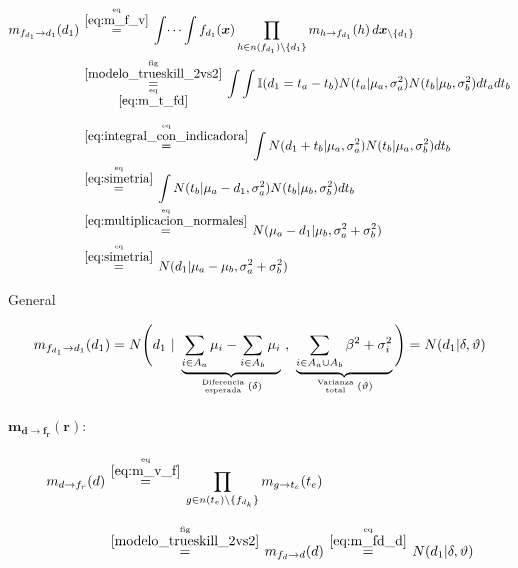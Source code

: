 \documentclass[article]{jss}
\newcommand\hfrac[2]{\genfrac{}{}{0pt}{}{#1}{#2}} %
\begin{document}
\begin{appendix}
\begin{equation}
 \begin{split}
  m_{f_{d_1} \rightarrow d_1}(d_1) & \overset{\hfrac{\text{eq}}{\ref{eq:m_f_v}}}{=} \int \dots \int f_{d_1}(\bm{x}) \prod_{h \in n(f_{d_1}) \setminus \{d_1\} } m_{h \rightarrow f_{d_1}}(h) \, d\bm{x}_{\setminus \{d_1\} }  \\
  & \overset{\hfrac{\text{fig}}{\ref{modelo_trueskill_2vs2}}}{\underset{\hfrac{\text{eq}}{\ref{eq:m_t_fd}}}{=}} \int \int \mathbb{I}(d_1 = t_a - t_b) N(t_a| \mu_a, \sigma_a^2)  N(t_b| \mu_b, \sigma_b^2)  dt_adt_b \\[0.25cm]
  & \overset{\hfrac{\text{eq}}{\ref{eq:integral_con_indicadora}}}{=} \int N(d_1 + t_b| \mu_a, \sigma_a^2)  N(t_b| \mu_a, \sigma_b^2)  dt_b \\
  & \overset{\hfrac{\text{eq}}{\ref{eq:simetria}}}{=} \int N(t_b| \mu_a - d_1 , \sigma_a^2)  N(t_b| \mu_b, \sigma_b^2)  dt_b \\
  & \overset{\hfrac{\text{eq}}{\ref{eq:multiplicacion_normales}}}{=} N( \mu_a - d_1 | \mu_b, \sigma_a^2 +\sigma_b^2  ) \\
  & \overset{\hfrac{\text{eq}}{\ref{eq:simetria}}}{=} N( d_1 | \mu_a - \mu_b, \sigma_a^2 +\sigma_b^2  )
 \end{split}
\end{equation}

General

\begin{equation} \label{eq:m_fd_d}
 m_{f_{d_1} \rightarrow d_1}(d_1) = N\Bigg(d_1 \ | \ \underbrace{\sum_{i \in A_a} \mu_i - \sum_{i \in A_b} \mu_i}_{\hfrac{\text{Diferencia}}{\text{esperada}} \, (\delta)} \ , \  \underbrace{\sum_{i \in A_a \cup A_b} \beta^2 + \sigma_i^2}_{\hfrac{\text{Varianza}}{\text{total}} \, (\vartheta) } \Bigg) = N(d_1 | \delta, \vartheta)
\end{equation}

\paragraph{$\bm{m_{d \rightarrow f_r}(r)}:$}

\begin{equation}\label{eq:m_d_fr}
\begin{split}
m_{d \rightarrow f_r}(d) & \overset{\hfrac{\text{eq}}{\ref{eq:m_v_f}}}{=} \prod_{g \in n(t_e) \setminus  \{f_{d_{k}} \}} m_{g \rightarrow t_e} (t_e) \\[0.3cm]
 & \overset{\hfrac{\text{fig}}{\ref{modelo_trueskill_2vs2}}}{=} m_{f_d \rightarrow d}(d) \overset{\hfrac{\text{eq}}{\ref{eq:m_fd_d}}}{=} N(d_1| \delta, \vartheta)
\end{split}
\end{equation}


\end{appendix}
\end{document}
